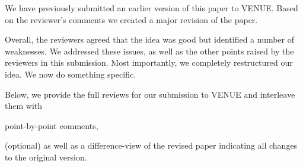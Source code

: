
We have previously submitted an earlier version of this paper to VENUE. 
Based on the reviewer's comments we created a major revision of the paper. 

Overall, the reviewers agreed that the idea was good but identified a number of weaknesses.
We addressed these issues, as well as the other points raised by the reviewers in this submission. 
Most importantly, we completely restructured our idea.
We now do something specific.

Below, we provide the full reviews for our submission to VENUE and interleave them with
\begin{xresponse}
point-by-point comments,
\end{xresponse}
(optional) as well as a difference-view of the revised paper indicating all changes to the original version.